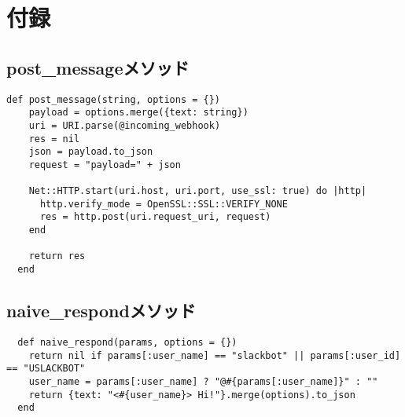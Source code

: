 \documentclass[12pt]{jsarticle}
\begin{document}
\section{付録}\label{sec:method}
\subsection{post\_messageメソッド}
\begin{verbatim}
def post_message(string, options = {})
    payload = options.merge({text: string})
    uri = URI.parse(@incoming_webhook)
    res = nil
    json = payload.to_json
    request = "payload=" + json

    Net::HTTP.start(uri.host, uri.port, use_ssl: true) do |http|
      http.verify_mode = OpenSSL::SSL::VERIFY_NONE
      res = http.post(uri.request_uri, request)
    end

    return res
  end
\end{verbatim}

\subsection{naive\_respondメソッド}
\begin{verbatim}
  def naive_respond(params, options = {})
    return nil if params[:user_name] == "slackbot" || params[:user_id] == "USLACKBOT"
    user_name = params[:user_name] ? "@#{params[:user_name]}" : ""
    return {text: "<#{user_name}> Hi!"}.merge(options).to_json
  end
\end{verbatim}



\end{document}
